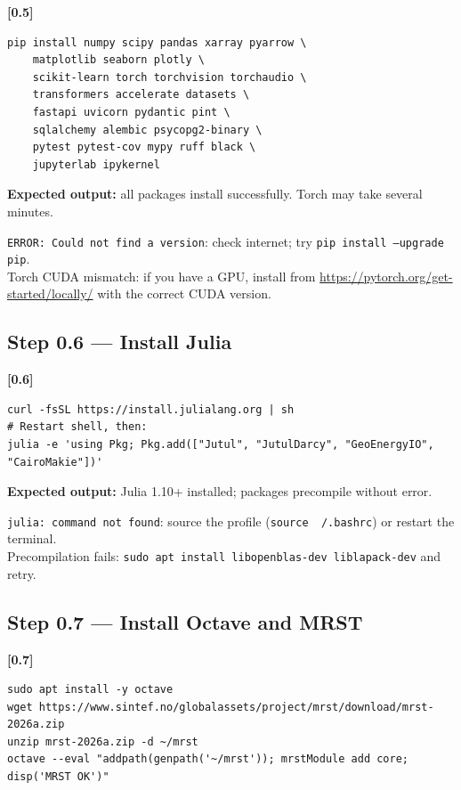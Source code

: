 \documentclass[10pt,a4paper]{article}
\newcommand{\stepID}[1]{\textsf{\textbf{[#1]}}}
\newcommand{\cmd}[1]{\texttt{#1}}
\begin{document}
\stepID{0.5}
\begin{lstlisting}[style=sh]
pip install numpy scipy pandas xarray pyarrow \
    matplotlib seaborn plotly \
    scikit-learn torch torchvision torchaudio \
    transformers accelerate datasets \
    fastapi uvicorn pydantic pint \
    sqlalchemy alembic psycopg2-binary \
    pytest pytest-cov mypy ruff black \
    jupyterlab ipykernel
\end{lstlisting}

\textbf{Expected output:} all packages install successfully. Torch may take several minutes.

\begin{failure}
\texttt{ERROR: Could not find a version}: check internet; try \cmd{pip install --upgrade pip}.\\
Torch CUDA mismatch: if you have a GPU, install from \url{https://pytorch.org/get-started/locally/} with the correct CUDA version.
\end{failure}

\subsection{Step 0.6 --- Install Julia}

\stepID{0.6}
\begin{lstlisting}[style=sh]
curl -fsSL https://install.julialang.org | sh
# Restart shell, then:
julia -e 'using Pkg; Pkg.add(["Jutul", "JutulDarcy", "GeoEnergyIO", "CairoMakie"])'
\end{lstlisting}

\textbf{Expected output:} Julia 1.10+ installed; packages precompile without error.

\begin{failure}
\texttt{julia: command not found}: source the profile (\cmd{source ~/.bashrc}) or restart the terminal.\\
Precompilation fails: \cmd{sudo apt install libopenblas-dev liblapack-dev} and retry.
\end{failure}

\subsection{Step 0.7 --- Install Octave and MRST}

\stepID{0.7}
\begin{lstlisting}[style=sh]
sudo apt install -y octave
wget https://www.sintef.no/globalassets/project/mrst/download/mrst-2026a.zip
unzip mrst-2026a.zip -d ~/mrst
octave --eval "addpath(genpath('~/mrst')); mrstModule add core; disp('MRST OK')"
\end{lstlisting}
\end{document}

